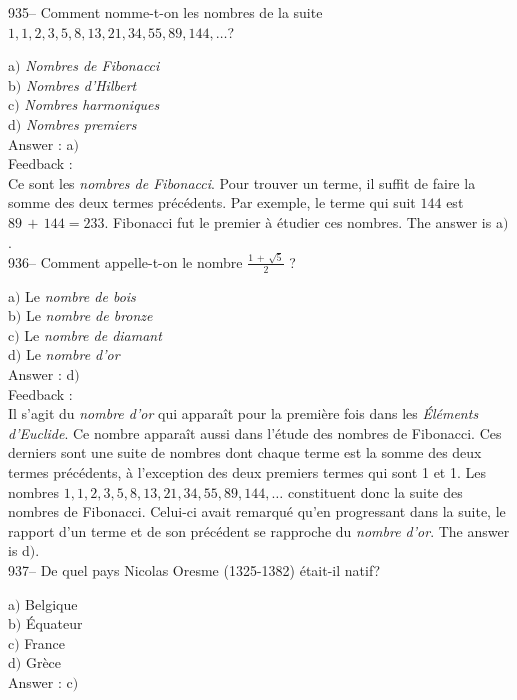 ﻿\documentclass[letterpaper, 12pt]{article}
\begin{document}
935-- Comment nomme-t-on les nombres de la suite
$1,1,2,3,5,8,13,21,34,55,89,144, \ldots$?

a$)$ {\sl Nombres de Fibonacci} \\
b$)$ {\sl Nombres d'Hilbert} \\
c$)$ {\sl Nombres harmoniques} \\
d$)$ {\sl Nombres premiers}\\

Answer : a$)$\\

Feedback : \\
Ce sont les {\sl nombres de Fibonacci}. Pour trouver un terme, il
suffit de faire la somme des deux termes pr\'ec\'edents. Par
exemple, le terme qui suit $144$ est $89\,+\,144=233$. Fibonacci fut
le premier \`a
\'etudier ces nombres. The answer is a$)$.\\

936-- Comment appelle-t-on le nombre $\frac{1\,+\,\sqrt5}2$ ?

a$)$ Le {\sl nombre de bois} \\
b$)$ Le {\sl nombre de bronze} \\
c$)$ Le {\sl nombre de diamant} \\
d$)$ Le {\sl nombre d'or}\\

Answer : d$)$\\

Feedback : \\
Il s'agit du {\sl nombre d'or} qui appara\^it pour la premi\`ere
fois dans les {\sl \'El\'ements d'Euclide}. Ce nombre appara\^it
aussi dans l'\'etude des nombres de Fibonacci. Ces derniers sont une
suite de nombres dont chaque terme est la somme des deux termes
pr\'ec\'edents,  \`a l'exception des deux premiers termes qui sont 1
et 1. Les nombres $1,1,2,3,5,8,13,21,34,55,89,144, \ldots$
constituent donc la suite des nombres de Fibonacci. Celui-ci avait
remarqu\'e qu'en progressant dans la suite, le rapport d'un terme et
de son pr\'ec\'edent
se rapproche du {\sl nombre d'or}. The answer is d$)$.\\

937-- De quel pays Nicolas Oresme (1325-1382) \'etait-il natif?

a$)$ Belgique \\
b$)$ \'Equateur  \\
c$)$ France \\
d$)$ Gr\`ece\\

Answer : c$)$\\
\end{document}
